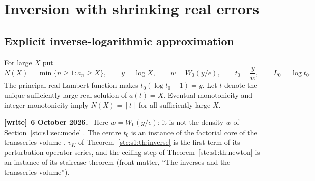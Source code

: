 \documentclass[11pt,letterpaper]{article}
\numberwithin{equation}{section}
\theoremstyle{remark}\newtheorem{remark}[theorem]{Remark}
\newcommand{\ceil}[1]{\left\lceil #1\right\rceil}
\newenvironment{writenote}[1][]{\par\smallskip\begingroup\small
 \noindent\textbf{[write]}\if\relax\detokenize{#1}\relax\else~\textbf{#1.}\fi\ }%
 {\par\endgroup\smallskip}
\begin{document}
\section{Inversion with shrinking real errors}\label{stc:s1:sec:inversion}
\subsection{Explicit inverse-logarithmic approximation}
For large $X$ put
\[
 N(X)=\min\{n\geq1:a_n\geq X\},\qquad y=\log X,
 \qquad w=W_0(y/e),\qquad t_0=\frac y w,\qquad L_0=\log t_0.
\]
The principal real Lambert function makes $t_0(\log t_0-1)=y$. Let $t$ denote the unique sufficiently large real solution of $a(t)=X$. Eventual monotonicity and integer monotonicity imply $N(X)=\ceil t$ for all sufficiently large $X$.

\begin{writenote}[6 October 2026]
Here $w=W_0(y/e)$; it is not the density $w$ of Section~\ref{stc:s1:sec:model}. The centre $t_0$ is an instance of the factorial core of the transseries volume \cite{TSvol}, $v_K$ of Theorem~\ref{stc:s1:th:inverse} is the first term of its perturbation-operator series, and the ceiling step of Theorem~\ref{stc:s1:th:newton} is an instance of its staircase theorem (front matter, ``The inverses and the transseries volume'').
\end{writenote}
\end{document}

